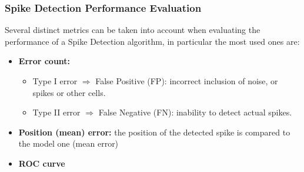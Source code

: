 \subsubsection{Spike Detection Performance Evaluation}
Several distinct metrics can be taken into account when evaluating the performance of
a Spike Detection algorithm, in particular the most used ones are:
\begin{itemize}
    \item \textbf{Error count:}
          \begin{itemize}
              \item Type I error \(\Rightarrow\) False Positive (FP): incorrect
                    inclusion of noise, or spikes or other cells.
              \item Type II error \(\Rightarrow\) False Negative (FN): inability to
                    detect actual spikes.
          \end{itemize}
    \item \textbf{Position (mean) error:} the position of the
          detected spike is compared to the model one (mean error)
    \item \textbf{ROC curve}
\end{itemize}
